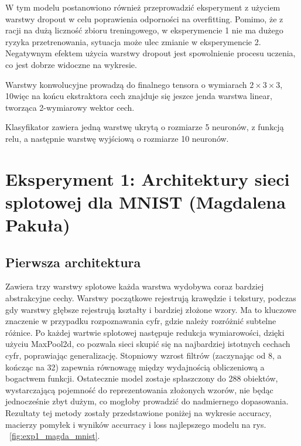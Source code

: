 \documentclass[10pt]{article}
\begin{document}
W tym modelu postanowiono również przeprowadzić eksperyment z użyciem warstwy dropout w celu poprawienia
odporności na overfitting.
Pomimo, że z racji na dużą liczność zbioru treningowego, w eksperymencie 1 nie ma dużego ryzyka przetrenowania,
sytuacja może ulec zmianie w eksperymencie 2. Negatywnym efektem użycia warstwy dropout jest spowolnienie procesu uczenia, co jest dobrze widoczne na wykresie.

Warstwy konwolucyjne prowadzą do finalnego tensora o wymiarach $2 \times 3 \times 3$, 10więc na końcu ekstraktora cech znajduje się jeszce jenda warstwa linear, tworząca 2-wymiarowy wektor cech.

Klasyfikator zawiera jedną warstwę ukrytą o rozmiarze 5 neuronów, z funkcją relu, a następnie warstwę wyjściową o rozmiarze 10 neuronów.

\pagebreak
\section{Eksperyment 1: Architektury sieci splotowej dla MNIST (Magdalena Pakuła)}\label{sec:ex1-pakula_mnist}

\subsection*{Pierwsza architektura}
Zawiera trzy warstwy splotowe każda warstwa wydobywa coraz bardziej abstrakcyjne cechy. Warstwy początkowe rejestrują krawędzie i tekstury, podczas gdy warstwy głębsze rejestrują kształty i bardziej złożone wzory. Ma to kluczowe znaczenie w przypadku rozpoznawania cyfr, gdzie należy rozróżnić subtelne różnice.
Po każdej wartwie splotowej następuje redukcja wymiarowości, dzięki użyciu MaxPool2d, co pozwala sieci skupić się na najbardziej istotnych cechach cyfr, poprawiając generalizację.
Stopniowy wzrost filtrów (zaczynając od 8, a kończąc na 32) zapewnia równowagę między wydajnością obliczeniową a bogactwem funkcji.
Ostatecznie model zostaje spłaszczony do 288 obiektów, wystarczającą pojemność do reprezentowania złożonych wzorów, nie będąc jednocześnie zbyt dużym, co mogłoby prowadzić do nadmiernego dopasowania.
Rezultaty tej metody zostały przedstawione poniżej na wykresie accuracy, macierzy pomyłek i wyników accurracy i loss najlepszego modelu na rys. ~\ref{fig:exp1_magda_mnist}.

\MagdaMnistLarge{}
\end{document}
